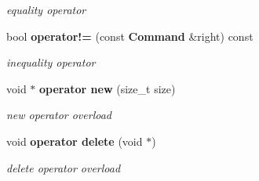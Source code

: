 \begin{DoxyCompactItemize}
\begin{DoxyCompactList}\small\item\em equality operator \item\end{DoxyCompactList}\item 
bool {\bf operator!=} (const {\bf Command} \&right) const \label{class_d_r_a_msim_i_i_1_1_command_a7680db3aeba3b242a5e45c6d1c7f3c49}

\begin{DoxyCompactList}\small\item\em inequality operator \item\end{DoxyCompactList}\item 
void $\ast$ {\bf operator new} (size\_\-t size)\label{class_d_r_a_msim_i_i_1_1_command_ae25604cfa43deb71cd91770ca9a83503}

\begin{DoxyCompactList}\small\item\em new operator overload \item\end{DoxyCompactList}\item 
void {\bf operator delete} (void $\ast$)\label{class_d_r_a_msim_i_i_1_1_command_ad4a5dbe9c559e026cda58119042946b7}

\begin{DoxyCompactList}\small\item\em delete operator overload \item\end{DoxyCompactList}\end{DoxyCompactItemize}
